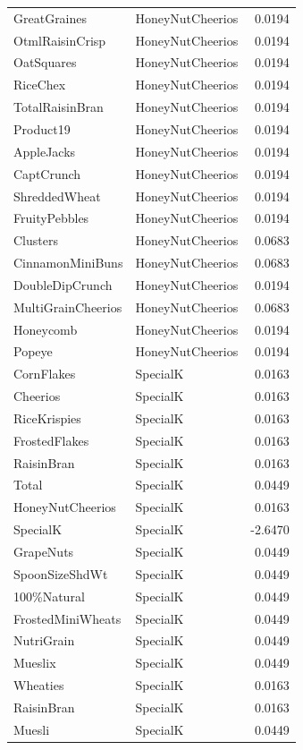 \begin{longtable}{llr}
GreatGraines & HoneyNutCheerios & 0.0194 \\
OtmlRaisinCrisp & HoneyNutCheerios & 0.0194 \\
OatSquares & HoneyNutCheerios & 0.0194 \\
RiceChex & HoneyNutCheerios & 0.0194 \\
TotalRaisinBran & HoneyNutCheerios & 0.0194 \\
Product19 & HoneyNutCheerios & 0.0194 \\
AppleJacks & HoneyNutCheerios & 0.0194 \\
CaptCrunch & HoneyNutCheerios & 0.0194 \\
ShreddedWheat & HoneyNutCheerios & 0.0194 \\
FruityPebbles & HoneyNutCheerios & 0.0194 \\
Clusters & HoneyNutCheerios & 0.0683 \\
CinnamonMiniBuns & HoneyNutCheerios & 0.0683 \\
DoubleDipCrunch & HoneyNutCheerios & 0.0194 \\
MultiGrainCheerios & HoneyNutCheerios & 0.0683 \\
Honeycomb & HoneyNutCheerios & 0.0194 \\
Popeye & HoneyNutCheerios & 0.0194 \\
CornFlakes & SpecialK & 0.0163 \\
Cheerios & SpecialK & 0.0163 \\
RiceKrispies & SpecialK & 0.0163 \\
FrostedFlakes & SpecialK & 0.0163 \\
RaisinBran & SpecialK & 0.0163 \\
Total & SpecialK & 0.0449 \\
HoneyNutCheerios & SpecialK & 0.0163 \\
SpecialK & SpecialK & -2.6470 \\
GrapeNuts & SpecialK & 0.0449 \\
SpoonSizeShdWt & SpecialK & 0.0449 \\
100\%Natural & SpecialK & 0.0449 \\
FrostedMiniWheats & SpecialK & 0.0449 \\
NutriGrain & SpecialK & 0.0449 \\
Mueslix & SpecialK & 0.0449 \\
Wheaties & SpecialK & 0.0163 \\
RaisinBran & SpecialK & 0.0163 \\
Muesli & SpecialK & 0.0449 \\

\end{longtable}
